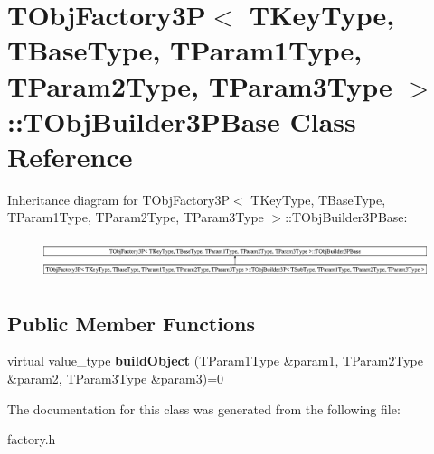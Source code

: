 \hypertarget{class_t_obj_factory3_p_1_1_t_obj_builder3_p_base}{\section{T\+Obj\+Factory3\+P$<$ T\+Key\+Type, T\+Base\+Type, T\+Param1\+Type, T\+Param2\+Type, T\+Param3\+Type $>$\+:\+:T\+Obj\+Builder3\+P\+Base Class Reference}
\label{class_t_obj_factory3_p_1_1_t_obj_builder3_p_base}
}
Inheritance diagram for T\+Obj\+Factory3\+P$<$ T\+Key\+Type, T\+Base\+Type, T\+Param1\+Type, T\+Param2\+Type, T\+Param3\+Type $>$\+:\+:T\+Obj\+Builder3\+P\+Base\+:\begin{figure}[H]
\begin{center}
\leavevmode
\includegraphics[height=1.178947cm]{class_t_obj_factory3_p_1_1_t_obj_builder3_p_base}
\end{center}
\end{figure}
\subsection*{Public Member Functions}
\begin{DoxyCompactItemize}
\item 
\hypertarget{class_t_obj_factory3_p_1_1_t_obj_builder3_p_base_adadd46321460cd7a8efc3d76d97bee9b}{virtual value\+\_\+type {\bfseries build\+Object} (T\+Param1\+Type \&param1, T\+Param2\+Type \&param2, T\+Param3\+Type \&param3)=0}\label{class_t_obj_factory3_p_1_1_t_obj_builder3_p_base_adadd46321460cd7a8efc3d76d97bee9b}

\end{DoxyCompactItemize}


The documentation for this class was generated from the following file\+:\begin{DoxyCompactItemize}
\item 
factory.\+h\end{DoxyCompactItemize}
